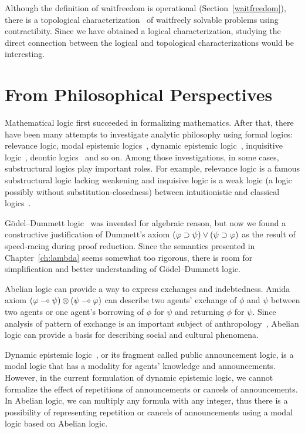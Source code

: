 Although the definition of waitfreedom is operational
(Section~\ref{waitfreedom}),
there is a topological characterization~\citep{Herlihy99,Saks:1993vq} of
waitfreely solvable problems using contractibity.
Since we have obtained a logical characterization, studying the direct
connection between the logical and topological characterizations would
be interesting.

\section{From Philosophical Perspectives}

Mathematical logic first succeeded in formalizing mathematics.
After that, there have been many attempts to investigate analytic
philosophy
using formal logics: relevance logic, modal epistemic
logics~\citep{sep-logic-epistemic},
dynamic epistemic logic~\citep{ditmarsch2007dynamic},
inquisitive logic~\citep{ciardelli2011},
deontic logics~\citep{von1951deontic} and
so on.  Among those investigations, in some cases, substructural logics
play important roles.  For example, relevance logic is a famous
substructural logic lacking weakening and inquisive logic is a weak
logic (a logic possibly without substitution-closedness) between
intuitionistic and classical logics~\citep{ciardelli2011}.

G\"odel--Dummett logic~\citep{dummett59} was invented for algebraic
reason, but now we found a constructive justification of Dummett's axiom
$(\varphi\supset\psi)\lor(\psi\supset\varphi)$ as the result of speed-racing during
proof reduction.  Since the semantics presented in
Chapter~\ref{ch:lambda} seems somewhat too rigorous,
there is room for simplification and better understanding of
G\"odel--Dummett logic.

Abelian logic can provide a way to express
exchanges and indebtedness.
Amida axiom $(\varphi\multimap
\psi)\otimes(\psi\multimap\varphi)$
can describe two agents' exchange of $\phi$ and $\psi$ between two agents
or one agent's borrowing of $\phi$ for $\psi$ and returning $\phi$ for
$\psi$.
Since analysis of pattern of exchange is an important subject of
anthropology~\citep{kula1920}, Abelian logic can provide a
basis for describing social and cultural phenomena.

Dynamic epistemic logic~\citep{ditmarsch2007dynamic}, or its fragment
called public announcement
logic, is a modal logic that has a modality for agents' knowledge and
announcements.  However, in the current formulation of dynamic epistemic
logic, we cannot formalize the effect of repetitions of announcements or
cancels of announcements.  In Abelian logic, we can multiply any formula
with any integer, thus there is a possibility of representing repetition
or cancels of announcements using a modal logic based on Abelian logic.

